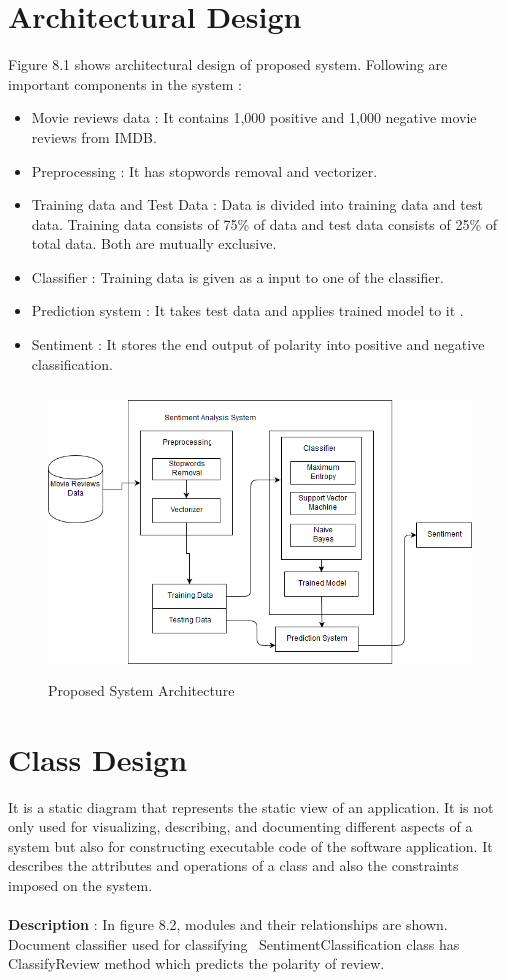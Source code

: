 \documentclass[oneside,a4paper,12pt]{pictreport}
\begin{document}
\section{Architectural Design}
Figure 8.1 shows architectural design of proposed system. Following are important components in the system :
\begin{itemize}
\item Movie reviews data : It contains 1,000 positive and 1,000 negative movie reviews from IMDB.
\item Preprocessing : It has stopwords removal and vectorizer.
\item Training data and Test Data : Data is divided into training data and test data. Training data consists of 75\%
of data and test data consists of 25\% of total data. Both are mutually exclusive.
\item Classifier : Training data is given as a input to one of the classifier.
\item Prediction system : It takes test data and applies trained model to it .
\item Sentiment : It stores the end output of polarity into positive and negative classification.   
\end{itemize}


\begin{figure}[!h]
\includegraphics[width=5.0in,height=3.0in]{archi.png}
\caption{Proposed System Architecture}
\end{figure}

\section{Class Design}
It is a static diagram that represents the static view of an application. It is not only used for visualizing, describing, and documenting different aspects of a system but also for constructing executable code of the software application. It describes the attributes and operations of a class and also the constraints imposed on the system.\\\\
\textbf{Description} : In figure 8.2, modules and their relationships are shown. Document classifier used for classifying \
SentimentClassification class has ClassifyReview method which predicts the polarity of review.
\end{document}
